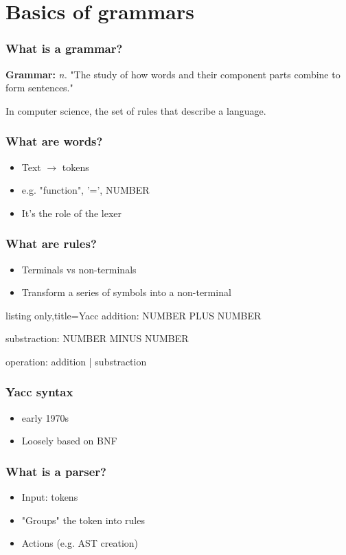 \section{Basics of grammars}
\setcounter{subsection}{1}


\begin{frame}
  \frametitle{What is a grammar?}
  \textbf{Grammar:} \textit{n.} "The study of how words and their component
  parts combine to form sentences."

  In computer science, the set of rules that describe a language.
\end{frame}


\begin{frame}
  \frametitle{What are words?}
  \begin{itemize}
    \item Text $\rightarrow$ tokens
    \item e.g. "function", '=', NUMBER
    \item It's the role of the lexer
  \end{itemize}
\end{frame}


\begin{frame}
  \frametitle{What are rules?}
  \begin{itemize}
    \item Terminals vs non-terminals
    \item Transform a series of symbols into a non-terminal
  \end{itemize}
\end{frame}

\begin{lrbox}{\codebox}
  \begin{tcblisting}{listing only,title=Yacc}
addition: NUMBER PLUS NUMBER

substraction: NUMBER MINUS NUMBER

operation:
  addition
| substraction
  \end{tcblisting}
\end{lrbox}
\begin{frame}
\frametitle{Yacc syntax}
  \begin{itemize}
    \item early 1970s
    \item Loosely based on BNF
  \end{itemize}
  \usebox{\codebox}
\end{frame}

\begin{frame}
  \frametitle{What is a parser?}
  \begin{itemize}
    \item Input: tokens
    \item "Groups" the token into rules
    \item Actions (e.g. AST creation)
  \end{itemize}
\end{frame}

